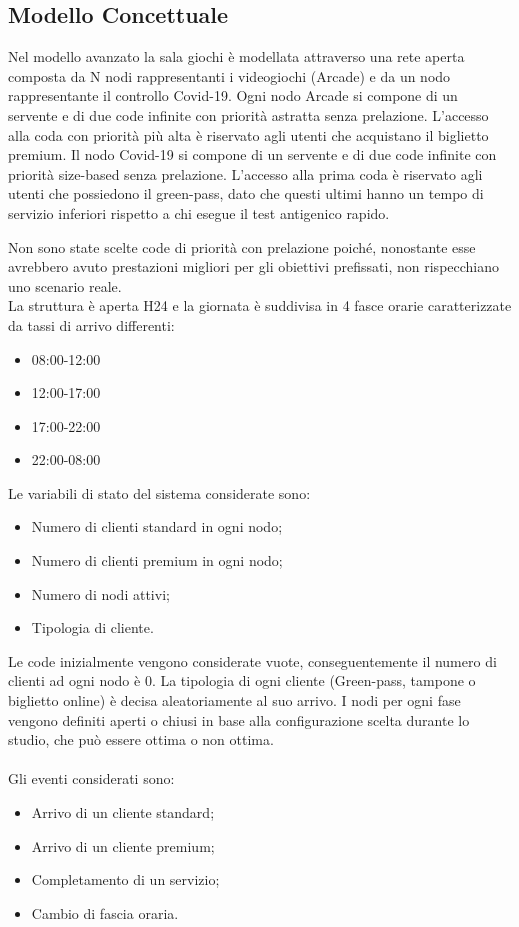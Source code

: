 \documentclass{article}
\begin{document}
\subsection{Modello Concettuale}
Nel modello avanzato la sala giochi è modellata attraverso una rete aperta composta da N nodi rappresentanti i videogiochi (Arcade) e da un nodo rappresentante il controllo Covid-19. Ogni nodo Arcade si compone di un servente e di due code infinite con priorità astratta senza prelazione. L'accesso alla coda con priorità più alta è riservato agli utenti che acquistano il biglietto premium.
Il nodo Covid-19 si compone di un servente e di due code infinite con priorità size-based senza prelazione. L'accesso alla prima coda è riservato agli utenti che possiedono il green-pass, dato che questi ultimi hanno un tempo di servizio inferiori rispetto a chi esegue il test antigenico rapido.
\par Non sono state scelte code di priorità con prelazione poiché, nonostante esse avrebbero avuto prestazioni migliori per gli obiettivi prefissati, non rispecchiano uno scenario reale.
\\
La struttura è aperta H24 e la giornata è suddivisa in 4 fasce orarie caratterizzate da tassi di arrivo differenti:
\begin{itemize}
\item 08:00-12:00
\item 12:00-17:00
\item 17:00-22:00
\item 22:00-08:00

\end{itemize}
Le variabili di stato del sistema considerate sono:
\begin{itemize}
\item Numero di clienti standard in ogni nodo;
\item Numero di clienti premium in ogni nodo;
\item Numero di nodi attivi;
\item Tipologia di cliente.
\end{itemize}
Le code inizialmente vengono considerate vuote, conseguentemente il numero di
clienti ad ogni nodo è 0. La tipologia di ogni cliente (Green-pass, tampone o biglietto online) è decisa aleatoriamente al suo arrivo. I nodi per ogni fase vengono definiti aperti o chiusi in base alla configurazione scelta durante lo studio, che può essere ottima o non
ottima.
\\ \\
Gli eventi considerati sono:
\begin{itemize}
\item Arrivo di un cliente standard;
\item Arrivo di un cliente premium;
\item Completamento di un servizio;
\item Cambio di fascia oraria.
\end{itemize}
\end{document}
